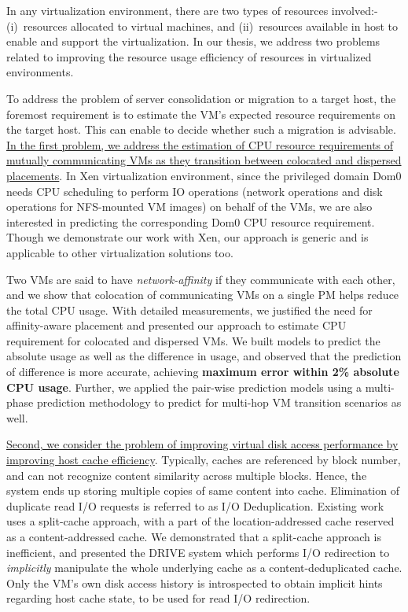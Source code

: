
In any virtualization environment, there are two types of resources
involved:- (i)~resources allocated to virtual machines, and
(ii)~resources available in host to enable and support the virtualization.
In our thesis, we address two problems related to improving 
the resource usage efficiency of resources in virtualized environments.

To address the problem of server consolidation or migration to
a target host,
the foremost requirement is to estimate the VM's expected resource
requirements on the target host. This can enable to decide whether
such a migration is advisable.
\ul{In the first problem, 
we address the estimation of CPU resource requirements
of mutually communicating VMs as they transition between colocated
and dispersed placements}.
In Xen virtualization environment, since the privileged
domain Dom0 needs CPU scheduling to perform IO operations
(network operations and disk operations for NFS-mounted
VM images) on behalf of the VMs, we are also interested in predicting the
corresponding Dom0 CPU resource requirement.
Though we demonstrate our work with Xen, our approach is generic and
is applicable to other virtualization solutions too.

Two VMs are said to have \textit{network-affinity} if they 
communicate with each other, and we show that colocation
of communicating VMs on a single PM helps reduce the total CPU usage.
With detailed measurements, we justified the need for
affinity-aware placement and presented our approach to estimate
CPU requirement for colocated and dispersed VMs. We built models to
predict the absolute usage as well as the difference in usage, and
observed that the prediction of difference is more accurate,
achieving \textbf{maximum error within 2\% absolute CPU usage}.
Further, we applied the pair-wise prediction models using a
multi-phase prediction methodology to predict for multi-hop VM 
transition scenarios as well.

\ul{Second, we consider the problem of improving virtual 
disk access performance by improving host cache efficiency}. 
Typically, caches are referenced by block number, 
and can not recognize content similarity
across multiple blocks. Hence, the system ends up storing
multiple copies of same content into cache.
Elimination of duplicate read I/O requests is referred to as I/O Deduplication.
Existing work uses a split-cache approach, with a part of the location-addressed
cache reserved as a content-addressed cache. We demonstrated
that a split-cache approach is inefficient, and presented the
DRIVE system which performs I/O
redirection to \textit{implicitly} manipulate the whole underlying cache as
a content-deduplicated cache. Only the VM's own disk access history is
introspected to obtain implicit hints regarding host cache state, to be used
for read I/O redirection.

